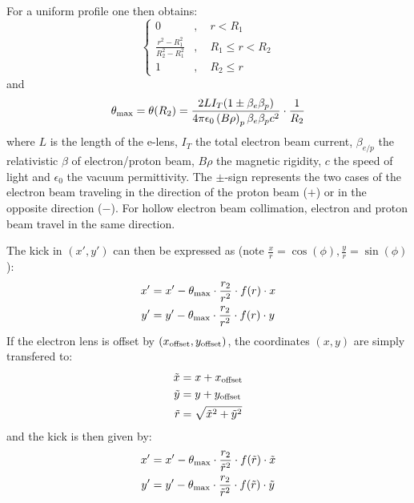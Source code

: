 \documentclass[english]{article}
\begin{document}
For a uniform profile one then obtains:
\begin{equation}
\begin{cases} 0 &,\quad r< R_1\\
\frac{r^2-R_1^2}{R_2^2-R_1^2} &,\quad R_1 \leq r < R_2\\
1 &,\quad R_2 \leq r
\end{cases}
\end{equation}
and
\begin{equation}
\theta_{\rm max} = \theta(R_2) = \frac{2LI_T(1\pm\beta_e\beta_p)}{4\pi\epsilon_0  \left(B\rho\right)_p\beta_e\beta_p c^2}\cdot\frac{1}{R_2}
\end{equation}
where $L$ is the length of the e-lens, $I_T$ the total electron beam current, $\beta_{e/p}$ the relativistic $\beta$ of electron/proton beam, $B\rho$ the magnetic rigidity, $c$ the speed of light and $\epsilon_0$ the vacuum permittivity. The $\pm$-sign represents the two cases of the electron beam traveling in the direction of the proton beam ($+$) or in the opposite direction ($-$). For hollow electron beam collimation, electron and proton beam travel in the same direction.

The kick in $(x',y')$ can then be expressed as (note $\frac{x}{r}=\cos(\phi),\frac{y}{r}=\sin(\phi)$):
\begin{align}
x'&=x'-\theta_{\rm max}\cdot\frac{r_2}{r^2}\cdot f(r)\cdot x\\
y'&=y'-\theta_{\rm max}\cdot\frac{r_2}{r^2}\cdot f(r)\cdot y
\end{align}
If the electron lens is offset by $(x_{\rm offset},y_{\rm offset})$, the coordinates $(x,y)$ are simply transfered to:
\begin{align}
\tilde x&=x+x_{\rm offset}\\
\tilde y&=y+y_{\rm offset}\\
\tilde r&=\sqrt{\tilde x^2+\tilde y^2}
\end{align}
and the kick is then given by:
\begin{align}
x'&=x'-\theta_{\rm max}\cdot\frac{r_2}{\tilde r^2}\cdot f(\tilde r)\cdot \tilde x\\
y'&=y'-\theta_{\rm max}\cdot\frac{r_2}{\tilde r^2}\cdot f(\tilde r)\cdot \tilde y
\end{align}
\end{document}
